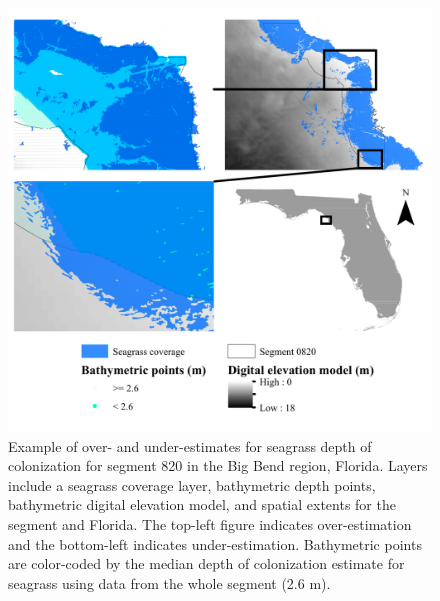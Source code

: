 \documentclass[letterpaper,12pt,oneside]{article}\usepackage[]{graphicx}\usepackage[]{color}
\begin{document}
\begin{figure}
\centerline{\includegraphics[width = \textwidth]{figs/wbid_doc.pdf}}
\caption{Example of over- and under-estimates for seagrass depth of colonization for segment 820 in the Big Bend region, Florida.  Layers include a seagrass coverage layer, bathymetric depth points, bathymetric digital elevation model, and spatial extents for the segment and Florida.  The top-left figure indicates over-estimation and the bottom-left indicates under-estimation.  Bathymetric points are color-coded by the median depth of colonization estimate for seagrass using data from the whole segment (2.6 m).}
\label{fig:wbid_doc}
\end{figure}

\end{document}
